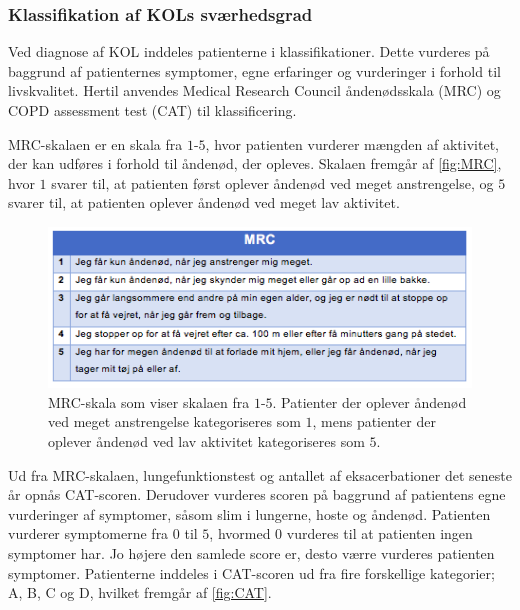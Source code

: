 \subsubsection{Klassifikation af KOLs sværhedsgrad}
Ved diagnose af KOL inddeles patienterne i klassifikationer. Dette vurderes på baggrund af patienternes symptomer, egne erfaringer og vurderinger i forhold til livskvalitet. Hertil anvendes Medical Research Council åndenødsskala (MRC) og COPD assessment test (CAT) til klassificering.\cite{Basisbogen2016}
 
MRC-skalaen er en skala fra $1$-$5$, hvor patienten vurderer mængden af aktivitet, der kan udføres i forhold til åndenød, der opleves. Skalaen fremgår af \autoref{fig:MRC}, hvor $1$ svarer til, at patienten først oplever åndenød ved meget anstrengelse, og $5$ svarer til, at patienten oplever åndenød ved meget lav aktivitet. \cite{Basisbogen2016}

\begin{figure} [H]
\centering
\includegraphics[width=1\textwidth]{figures/MRC}
\caption{MRC-skala som viser skalaen fra $1$-$5$. Patienter der oplever åndenød ved meget anstrengelse kategoriseres som $1$, mens patienter der oplever åndenød ved lav aktivitet kategoriseres som $5$.}
\label{fig:MRC}
\end{figure} 

\noindent
Ud fra MRC-skalaen, lungefunktionstest og antallet af eksacerbationer det seneste år opnås CAT-scoren. Derudover vurderes scoren på baggrund af patientens egne vurderinger af symptomer, såsom slim i lungerne, hoste og åndenød. Patienten vurderer symptomerne fra $0$ til $5$, hvormed $0$ vurderes til at patienten ingen symptomer har. Jo højere den samlede score er, desto værre vurderes patienten symptomer. \cite{Basisbogen2016, dsam2016} Patienterne inddeles i CAT-scoren ud fra fire forskellige kategorier; A, B, C og D, hvilket fremgår af \autoref{fig:CAT}.

